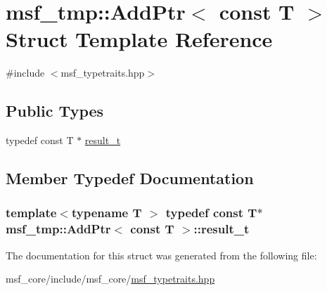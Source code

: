 \hypertarget{structmsf__tmp_1_1AddPtr_3_01const_01T_01_4}{\section{msf\-\_\-tmp\-:\-:Add\-Ptr$<$ const T $>$ Struct Template Reference}
\label{structmsf__tmp_1_1AddPtr_3_01const_01T_01_4}
}


{\ttfamily \#include $<$msf\-\_\-typetraits.\-hpp$>$}

\subsection*{Public Types}
\begin{DoxyCompactItemize}
\item 
typedef const T $\ast$ \hyperlink{structmsf__tmp_1_1AddPtr_3_01const_01T_01_4_a7fed44d9f82eab74ebc3afd453547904}{result\-\_\-t}
\end{DoxyCompactItemize}


\subsection{Member Typedef Documentation}
\hypertarget{structmsf__tmp_1_1AddPtr_3_01const_01T_01_4_a7fed44d9f82eab74ebc3afd453547904}{
\subsubsection[{result\-\_\-t}]{\setlength{\rightskip}{0pt plus 5cm}template$<$typename T $>$ typedef const T$\ast$ {\bf msf\-\_\-tmp\-::\-Add\-Ptr}$<$ const T $>$\-::{\bf result\-\_\-t}}}\label{structmsf__tmp_1_1AddPtr_3_01const_01T_01_4_a7fed44d9f82eab74ebc3afd453547904}


The documentation for this struct was generated from the following file\-:\begin{DoxyCompactItemize}
\item 
msf\-\_\-core/include/msf\-\_\-core/\hyperlink{msf__typetraits_8hpp}{msf\-\_\-typetraits.\-hpp}\end{DoxyCompactItemize}
